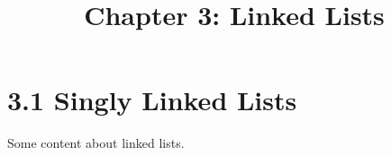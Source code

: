 \documentclass{article}
\title{Chapter 3: Linked Lists}
\begin{document}
\section{3.1 Singly Linked Lists}
Some content about linked lists.
\end{document}
